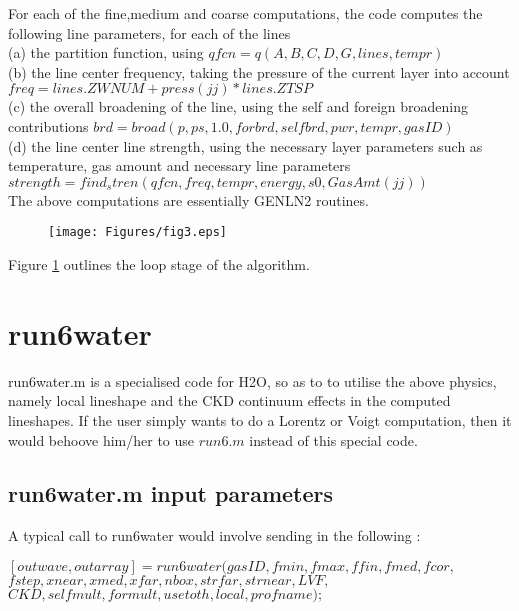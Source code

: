 \documentclass[11pt]{article}
\begin{document}
For each of the fine,medium and coarse computations, the code computes
the following line parameters, for each of the lines\\
(a) the partition function, using $qfcn=q(A,B,C,D,G,lines,tempr)$\\
(b) the line center frequency, taking the pressure of the current layer into
    account $freq=lines.ZWNUM+press(jj)*lines.ZTSP$\\
(c) the overall broadening of the line, using the self and foreign 
    broadening
    contributions $brd=broad(p,ps,1.0,forbrd,selfbrd,pwr,tempr,gasID)$\\
(d) the line center line strength, using the necessary layer parameters 
    such as temperature, gas amount and necessary line parameters \\
    $strength=find_stren(qfcn,freq,tempr,energy,s0,GasAmt(jj))$\\
The above computations are essentially GENLN2 routines.

\begin{figure}[h]
  \begin{center}\texttt{[image: Figures/fig3.eps]}\end{center}
  \caption[Outline of loops over layers and fine,medium,coarse meshes]{}
  \label{fig:loop_alg}
\end{figure}

Figure \ref{fig:loop_alg} outlines the loop stage of the algorithm.

\section{run6water}

run6water.m is a specialised code for H2O, so as to to utilise the above 
physics, namely local lineshape and the CKD continuum effects in the 
computed 
lineshapes. If the user simply wants to do a Lorentz or Voigt computation,
then it would behoove him/her to use $run6.m$ instead of this special code.

\subsection{run6water.m input parameters}

A typical call to run6water would involve sending in the following : 

$[outwave,outarray]=run6water(gasID,fmin,fmax,ffin,fmed,fcor,$\\
              $fstep,xnear,xmed,xfar,nbox,strfar,strnear,LVF,$\\
              $CKD,selfmult,formult,usetoth,local,profname);$
\end{document}
